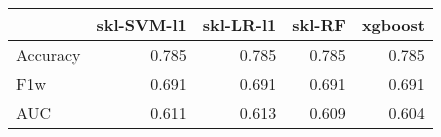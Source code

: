 \begin{tabular}{lrrrr}
\toprule
{} &  skl-SVM-l1 &  skl-LR-l1 &  skl-RF &  xgboost \\
\midrule
Accuracy &       0.785 &      0.785 &   0.785 &    0.785 \\
F1w      &       0.691 &      0.691 &   0.691 &    0.691 \\
AUC      &       0.611 &      0.613 &   0.609 &    0.604 \\
\bottomrule
\end{tabular}
